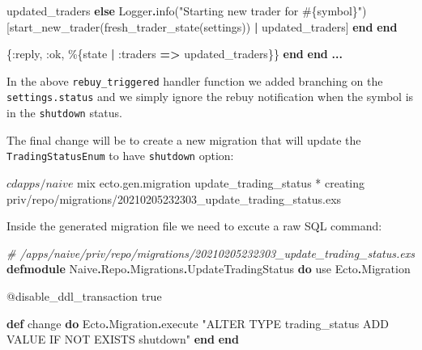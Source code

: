 \documentclass[
  oneside]{book}
\newenvironment{Shaded}{\begin{snugshade}}{\end{snugshade}}
\newcommand{\CommentTok}[1]{\textcolor[rgb]{0.56,0.35,0.01}{\textit{#1}}}
\newcommand{\ConstantTok}[1]{\textcolor[rgb]{0.00,0.00,0.00}{#1}}
\newcommand{\ControlFlowTok}[1]{\textcolor[rgb]{0.13,0.29,0.53}{\textbf{#1}}}
\newcommand{\ExtensionTok}[1]{#1}
\newcommand{\ImportTok}[1]{#1}
\newcommand{\KeywordTok}[1]{\textcolor[rgb]{0.13,0.29,0.53}{\textbf{#1}}}
\newcommand{\NormalTok}[1]{#1}
\newcommand{\OperatorTok}[1]{\textcolor[rgb]{0.81,0.36,0.00}{\textbf{#1}}}
\newcommand{\OtherTok}[1]{\textcolor[rgb]{0.56,0.35,0.01}{#1}}
\newcommand{\StringTok}[1]{\textcolor[rgb]{0.31,0.60,0.02}{#1}}
\newcommand{\VariableTok}[1]{\textcolor[rgb]{0.00,0.00,0.00}{#1}}
\begin{document}
\begin{Shaded}
\begin{Highlighting}[]
\NormalTok{              updated\_traders}
            \ControlFlowTok{else}
              \ConstantTok{Logger}\OperatorTok{.}\NormalTok{info(}\StringTok{"Starting new trader for }\OtherTok{\#\{}\NormalTok{symbol}\OtherTok{\}}\StringTok{"}\NormalTok{)}
\NormalTok{              [start\_new\_trader(fresh\_trader\_state(settings)) }\OperatorTok{|}\NormalTok{ updated\_traders]}
            \KeywordTok{end}
          \KeywordTok{end}

\NormalTok{        \{}\VariableTok{:reply}\NormalTok{, }\VariableTok{:ok}\NormalTok{, \%\{state }\OperatorTok{|} \VariableTok{:traders} \OperatorTok{=\textgreater{}}\NormalTok{ updated\_traders\}\}}
    \KeywordTok{end}
  \KeywordTok{end}
  \OperatorTok{...}
\end{Highlighting}
\end{Shaded}

In the above \texttt{rebuy\_triggered} handler function we added branching on the \texttt{settings.status} and we simply ignore the rebuy notification when the symbol is in the \texttt{shutdown} status.

The final change will be to create a new migration that will update the \texttt{TradingStatusEnum} to have \texttt{shutdown} option:

\begin{Shaded}
\begin{Highlighting}[]
\ExtensionTok{$}\NormalTok{ cd apps/naive }
\ExtensionTok{$}\NormalTok{ mix ecto.gen.migration update\_trading\_status}
\ExtensionTok{*}\NormalTok{ creating priv/repo/migrations/20210205232303\_update\_trading\_status.exs}
\end{Highlighting}
\end{Shaded}

Inside the generated migration file we need to excute a raw SQL command:

\begin{Shaded}
\begin{Highlighting}[]
\CommentTok{\# /apps/naive/priv/repo/migrations/20210205232303\_update\_trading\_status.exs}
\KeywordTok{defmodule} \ConstantTok{Naive}\OperatorTok{.}\ConstantTok{Repo}\OperatorTok{.}\ConstantTok{Migrations}\OperatorTok{.}\ConstantTok{UpdateTradingStatus} \KeywordTok{do}
  \ImportTok{use} \ConstantTok{Ecto}\OperatorTok{.}\ConstantTok{Migration}

  \OtherTok{@disable\_ddl\_transaction} \ConstantTok{true}

  \KeywordTok{def}\NormalTok{ change }\KeywordTok{do}
    \ConstantTok{Ecto}\OperatorTok{.}\ConstantTok{Migration}\OperatorTok{.}\NormalTok{execute }\StringTok{"ALTER TYPE trading\_status ADD VALUE IF NOT EXISTS \textquotesingle{}shutdown\textquotesingle{}"}
  \KeywordTok{end}
\KeywordTok{end}
\end{Highlighting}
\end{Shaded}
\end{document}
